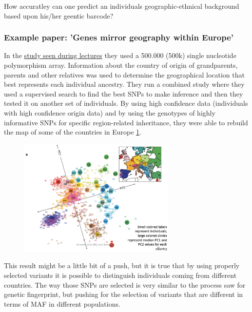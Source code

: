 How accuratley can one predict an individuals geographic-ethnical background
based upon his/her geentic barcode?

\subsubsection{Example paper: 'Genes mirror geography within Europe'}

In the \href{https://www.ncbi.nlm.nih.gov/pmc/articles/PMC2735096/}{study seen
during lectures} they used a 500.000 (500k) single nucleotide polymorphism
array. Information about the country of origin of grandparents, parents and
other relatives was used to determine the geographical location that best
represents each individual ancestry. They run a combined study where they used a
supervised search to find the best SNPs to make inference and then they tested
it on another set of individuals. By using high confidence data (individuals
with high confidence origin data) and by using the genotypes of highly
informative SNPs for specific region-related inheritance, they were able to
rebuild the map of some of the countries in Europe \ref{fig:PCA_countries}. 

\begin{figure}[h]
	\centering
	\includegraphics[width=0.7\textwidth]{PCA.PNG}
	\caption{\label{fig:PCA_countries}}
\end{figure}

This result might be a little bit of a push, but it is true that by using
properly selected variants it is possible to distinguish individuals coming from
different countries. The way those SNPs are selected is very similar to the
process saw for genetic fingerprint, but pushing for the selection of variants
that are different in terms of MAF in different populations. 


